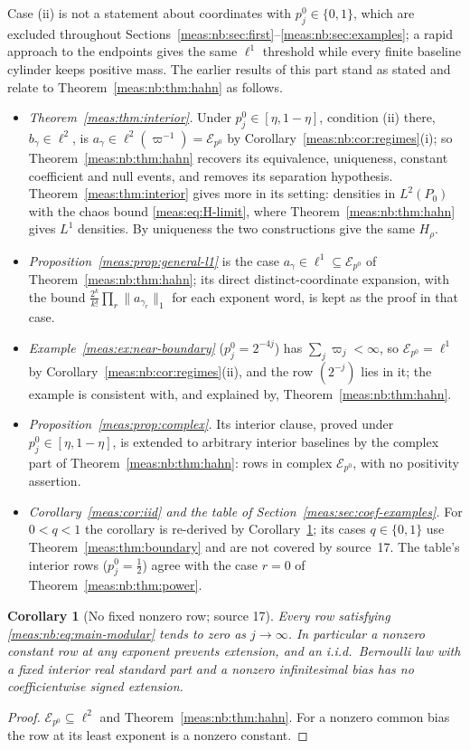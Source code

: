 \documentclass[11pt]{article}
\numberwithin{equation}{section}
\newtheorem{corollary}[theorem]{Corollary}
\theoremstyle{definition}
\theoremstyle{remark}
\newcommand{\norm}[1]{\lVert#1\rVert}
\newcommand{\Erow}{\mathcal E_{p^0}}
\begin{document}
Case (ii) is not a statement about coordinates with $p_j^0\in\{0,1\}$, which are
excluded throughout Sections~\ref{meas:nb:sec:first}--\ref{meas:nb:sec:examples}; a rapid
approach to the endpoints gives the same $\ell^1$ threshold while every finite
baseline cylinder keeps positive mass. The earlier results of this part stand as
stated and relate to Theorem~\ref{meas:nb:thm:hahn} as follows.
\begin{itemize}
\item \emph{Theorem~\ref{meas:thm:interior}.} Under $p_j^0\in[\eta,1-\eta]$, condition
(ii) there, $b_\gamma\in\ell^2$, is $a_\gamma\in\ell^2(\varpi^{-1})=\Erow$ by
Corollary~\ref{meas:nb:cor:regimes}(i); so Theorem~\ref{meas:nb:thm:hahn} recovers its
equivalence, uniqueness, constant coefficient and null events, and removes its
separation hypothesis. Theorem~\ref{meas:thm:interior} gives more in its setting:
densities in $L^2(P_0)$ with the chaos bound \eqref{meas:eq:H-limit}, where
Theorem~\ref{meas:nb:thm:hahn} gives $L^1$ densities. By uniqueness the two
constructions give the same $H_\rho$.
\item \emph{Proposition~\ref{meas:prop:general-l1}} is the case
$a_\gamma\in\ell^1\subseteq\Erow$ of Theorem~\ref{meas:nb:thm:hahn}; its direct
distinct-coordinate expansion, with the bound
$\frac{2^k}{k!}\prod_r\norm{a_{\gamma_r}}_1$ for each exponent word, is kept as the proof
in that case.
\item \emph{Example~\ref{meas:ex:near-boundary}} ($p_j^0=2^{-4j}$) has
$\sum_j\varpi_j<\infty$, so $\Erow=\ell^1$ by Corollary~\ref{meas:nb:cor:regimes}(ii),
and the row $(2^{-j})$ lies in it; the example is consistent with, and explained
by, Theorem~\ref{meas:nb:thm:hahn}.
\item \emph{Proposition~\ref{meas:prop:complex}.} Its interior clause, proved under
$p_j^0\in[\eta,1-\eta]$, is extended to arbitrary interior baselines by the complex
part of Theorem~\ref{meas:nb:thm:hahn}: rows in complex $\Erow$, with no positivity
assertion.
\item \emph{Corollary~\ref{meas:cor:iid} and the table of
Section~\ref{meas:sec:coef-examples}.} For $0<q<1$ the corollary is re-derived by
Corollary~\ref{meas:nb:cor:constant}; its cases $q\in\{0,1\}$ use
Theorem~\ref{meas:thm:boundary} and are not covered by source~17. The table's
interior rows ($p_j^0=\frac12$) agree with the case $r=0$ of
Theorem~\ref{meas:nb:thm:power}.
\end{itemize}

\begin{corollary}[No fixed nonzero row; source 17]\label{meas:nb:cor:constant}
Every row satisfying \eqref{meas:nb:eq:main-modular} tends to zero as
$j\to\infty$. In particular a nonzero constant row at any exponent prevents
extension, and an i.i.d.\ Bernoulli law with a fixed interior real standard part
and a nonzero infinitesimal bias has no coefficientwise signed extension.
\end{corollary}
\begin{proof}
$\Erow\subseteq\ell^2$ and Theorem~\ref{meas:nb:thm:hahn}. For a nonzero common bias
the row at its least exponent is a nonzero constant.
\end{proof}
\end{document}
